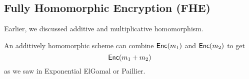 



\subsection{Fully Homomorphic Encryption (FHE)}

Earlier, we discussed additive and multiplicative homomorphism.

An additively homomorphic scheme can combine $\operatorname{\mathsf{Enc}}(m_1)$ and $\operatorname{\mathsf{Enc}}(m_2)$ to get
\[\operatorname{\mathsf{Enc}}(m_1 + m_2)\]
as we saw in Exponential ElGamal or Paillier.


